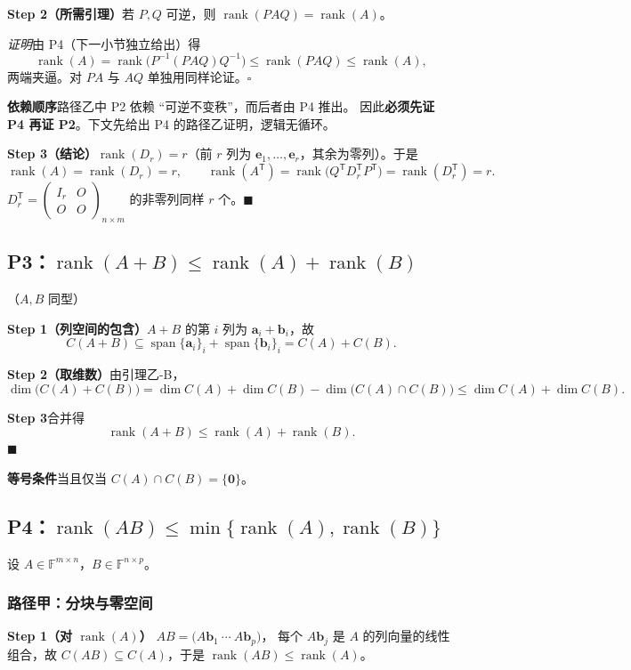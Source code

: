 \documentclass[11pt]{ctexart}
\newcommand{\rank}{\operatorname{rank}}
\newcommand{\F}{\mathbb{F}}
\newcommand{\T}{^{\mathsf T}}
\begin{document}
\textbf{Step 2（所需引理）}\quad 若 $P,Q$ 可逆，则 $\rank(PAQ)=\rank(A)$。

\emph{证明}\quad 由 P4（下一小节独立给出）得
\[
\rank(A)=\rank\bigl(P^{-1}(PAQ)Q^{-1}\bigr)\le\rank(PAQ)\le\rank(A),
\]
两端夹逼。对 $PA$ 与 $AQ$ 单独用同样论证。\hfill$\square$

\begin{warnbox}
\textbf{依赖顺序}\quad 路径乙中 P2 依赖 ``可逆不变秩''，而后者由 P4 推出。
因此\textbf{必须先证 P4 再证 P2}。下文先给出 P4 的路径乙证明，逻辑无循环。
\end{warnbox}

\textbf{Step 3（结论）}\quad $\rank(D_r)=r$（前 $r$ 列为 $\mathbf e_1,\dots,\mathbf e_r$，其余为零列）。于是
\[
\rank(A)=\rank(D_r)=r,\qquad
\rank(A\T)=\rank\bigl(Q\T D_r\T P\T\bigr)=\rank(D_r\T)=r .
\]
$D_r\T=\begin{pmatrix}I_r&O\\O&O\end{pmatrix}_{n\times m}$ 的非零列同样 $r$ 个。\hfill$\blacksquare$

\subsection{P3：$\rank(A+B)\le\rank(A)+\rank(B)$}
（$A,B$ 同型）

\textbf{Step 1（列空间的包含）}\quad $A+B$ 的第 $i$ 列为 $\mathbf a_i+\mathbf b_i$，故
\[
C(A+B)\subseteq\operatorname{span}\{\mathbf a_i\}_i+\operatorname{span}\{\mathbf b_i\}_i=C(A)+C(B).
\]

\textbf{Step 2（取维数）}\quad 由引理乙-B，
\[
\dim\bigl(C(A)+C(B)\bigr)=\dim C(A)+\dim C(B)-\dim\bigl(C(A)\cap C(B)\bigr)\le\dim C(A)+\dim C(B).
\]

\textbf{Step 3}\quad 合并得
\[
\rank(A+B)\le\rank(A)+\rank(B). \tag{P3}
\]
\hfill$\blacksquare$

\textbf{等号条件}\quad 当且仅当 $C(A)\cap C(B)=\{\mathbf 0\}$。

\subsection{P4：$\rank(AB)\le\min\{\rank(A),\rank(B)\}$}
设 $A\in\F^{m\times n}$，$B\in\F^{n\times p}$。

\subsubsection{路径甲：分块与零空间}
\textbf{Step 1（对 $\rank(A)$）}\quad
$AB=\bigl(A\mathbf b_1\ \cdots\ A\mathbf b_p\bigr)$，
每个 $A\mathbf b_j$ 是 $A$ 的列向量的线性组合，故 $C(AB)\subseteq C(A)$，于是 $\rank(AB)\le\rank(A)$。
\end{document}
